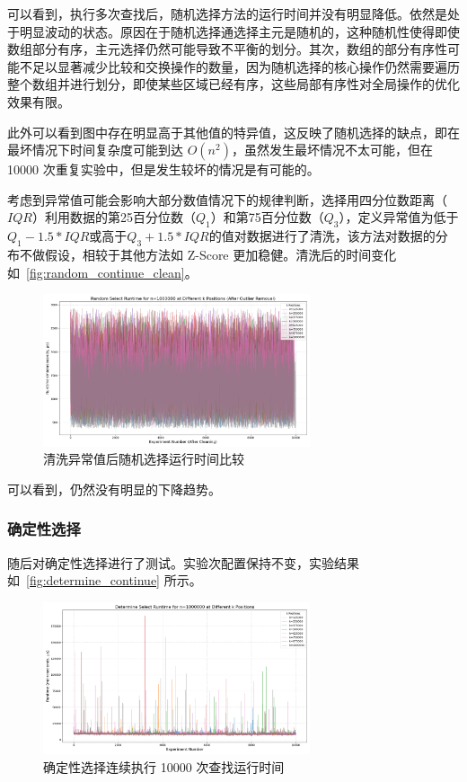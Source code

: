 可以看到，执行多次查找后，随机选择方法的运行时间并没有明显降低。依然是处于明显波动的状态。原因在于随机选择通选择主元是随机的，这种随机性使得即使数组部分有序，主元选择仍然可能导致不平衡的划分。其次，数组的部分有序性可能不足以显著减少比较和交换操作的数量，因为随机选择的核心操作仍然需要遍历整个数组并进行划分，即使某些区域已经有序，这些局部有序性对全局操作的优化效果有限。

此外可以看到图中存在明显高于其他值的特异值，这反映了随机选择的缺点，即在最坏情况下时间复杂度可能到达 $O(n^2)$，虽然发生最坏情况不太可能，但在 10000 次重复实验中，但是发生较坏的情况是有可能的。

考虑到异常值可能会影响大部分数值情况下的规律判断，选择用四分位数距离（$IQR$）利用数据的第25百分位数（$Q_1$）和第75百分位数（$Q_3$），定义异常值为低于$Q_1 - 1.5 * IQR$或高于$Q_3 + 1.5 * IQR$的值对数据进行了清洗，该方法对数据的分布不做假设，相较于其他方法如 Z-Score 更加稳健。清洗后的时间变化如~\autoref{fig:random_continue_clean}。
\begin{figure}[htbp]
    \centering
    \includegraphics[width=0.7\textwidth]{../figure/random_continue_clean.png}
    \caption{清洗异常值后随机选择运行时间比较}
    \label{fig:random_continue_clean}
\end{figure}

可以看到，仍然没有明显的下降趋势。

\subsubsection{确定性选择}
随后对确定性选择进行了测试。实验次配置保持不变，实验结果如~\autoref{fig:determine_continue} 所示。\begin{figure}
    \centering
    \includegraphics[width=0.7\textwidth]{../figure/determine_continue.png}
    \caption{确定性选择连续执行 10000 次查找运行时间}
    \label{fig:determine_continue}
\end{figure}

